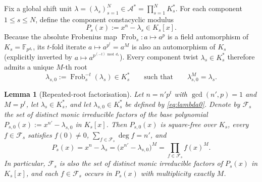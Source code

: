 \documentclass[preprint,12pt]{elsarticle}
\newcommand{\F}{\mathbb F}
\newcommand{\A}{\mathcal A}
\newcommand{\Fs}{\mathcal F_s}
\numberwithin{equation}{section}
\theoremstyle{plain}
\newtheorem{lemma}[theorem]{Lemma}
\theoremstyle{definition}
\theoremstyle{remark}
\begin{document}
Fix a global shift unit $\lambda=(\lambda_s)_{s=1}^{N}\in\A^*=\prod_{s=1}^{N}K_s^*$.
For each component $1\le s\le N$, define the component constacyclic modulus
\begin{equation}\label{eq:modulus}
P_s(x):=x^n-\lambda_s\in K_s[x].
\end{equation}
Because the absolute Frobenius map $\operatorname{Frob}_s:a\mapsto a^p$ is a
field automorphism of $K_s=\F_{p^{d_s}}$, its $t$-fold iterate
$a\mapsto a^{p^t}=a^M$ is also an automorphism of $K_s$ (explicitly inverted by
$a\mapsto a^{p^{(-t)\bmod d_s}}$). Every component twist $\lambda_s\in K_s^*$
therefore admits a unique $M$-th root
\begin{equation}\label{eq:lambda0}
\lambda_{s,0}:=\operatorname{Frob}_s^{-t}(\lambda_s)\in K_s^*
\qquad\text{such that}\qquad
\lambda_{s,0}^M=\lambda_s.
\end{equation}

\begin{lemma}[Repeated-root factorisation]\label{lem:factorisation}
Let $n=n'p^t$ with $\gcd(n',p)=1$ and $M=p^t$, let $\lambda_s\in K_s^*$, and let
$\lambda_{s,0}\in K_s^*$ be defined by \eqref{eq:lambda0}. Denote by $\Fs$ the
set of distinct monic irreducible factors of the base polynomial
$P_{s,0}(x):=x^{n'}-\lambda_{s,0}$ in $K_s[x]$. Then $P_{s,0}(x)$ is square-free
over $K_s$, every $f\in\Fs$ satisfies $f(0)\neq 0$,
$\sum_{f\in\Fs}\deg f=n'$, and
\begin{equation}\label{eq:pure-power}
P_s(x)=x^n-\lambda_s=\bigl(x^{n'}-\lambda_{s,0}\bigr)^M
      =\prod_{f\in\Fs} f(x)^M.
\end{equation}
In particular, $\Fs$ is also the set of distinct monic irreducible factors of
$P_s(x)$ in $K_s[x]$, and each $f\in\Fs$ occurs in $P_s(x)$ with multiplicity
exactly $M$.
\end{lemma}
\end{document}
